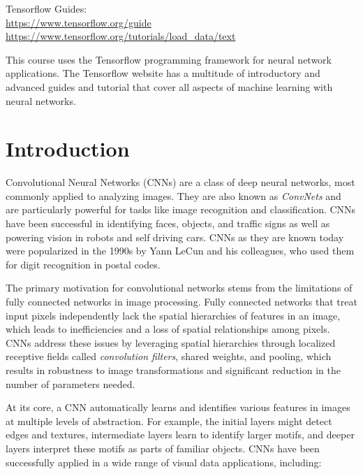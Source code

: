 \begin{resourcebox}
Tensorflow Guides: \\

\small\url{https://www.tensorflow.org/guide}\normalsize \\

\small\url{https://www.tensorflow.org/tutorials/load_data/text}\normalsize
\end{resourcebox}

This course uses the Tensorflow programming framework for neural network applications. The Tensorflow website has a multitude of introductory and advanced guides and tutorial that cover all aspects of machine learning with neural networks. 

\section{Introduction}

Convolutional Neural Networks (CNNs) are a class of deep neural networks, most commonly applied to analyzing images. They are also known as \emph{ConvNets} and are particularly powerful for tasks like image recognition and classification. CNNs have been successful in identifying faces, objects, and traffic signs as well as powering vision in robots and self driving cars. CNNs as they are known today were popularized in the 1990s by Yann LeCun and his colleagues, who used them for digit recognition in postal codes. 

The primary motivation for convolutional networks stems from the limitations of fully connected networks in image processing. Fully connected networks that treat input pixels independently lack the spatial hierarchies of features in an image, which leads to inefficiencies and a loss of spatial relationships among pixels. CNNs address these issues by leveraging spatial hierarchies through localized receptive fields called \emph{convolution filters}, shared weights, and pooling, which results in robustness to image transformations and significant reduction in the number of parameters needed.

At its core, a CNN automatically learns and identifies various features in images at multiple levels of abstraction. For example, the initial layers might detect edges and textures, intermediate layers learn to identify larger motifs, and deeper layers interpret these motifs as parts of familiar objects. CNNs have been successfully applied in a wide range of visual data applications, including:


